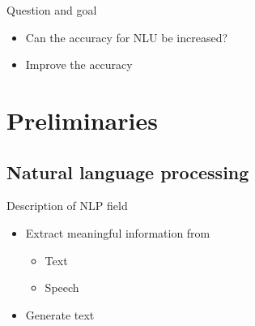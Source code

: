 \documentclass[pdf]{beamer}
\begin{document}
    \begin{frame}{Question and goal}
        \begin{itemize}
            \item Can the accuracy for NLU be increased?
            \item Improve the accuracy
        \end{itemize}
    \end{frame}


    \section{Preliminaries}
    \subsection{Natural language processing}
    \begin{frame}{Description of NLP field}
        \begin{itemize}
            \item Extract meaningful information from
            \begin{itemize}
                \item Text
                \item Speech
            \end{itemize}
            \item Generate text
        \end{itemize}
    \end{frame}
\end{document}

